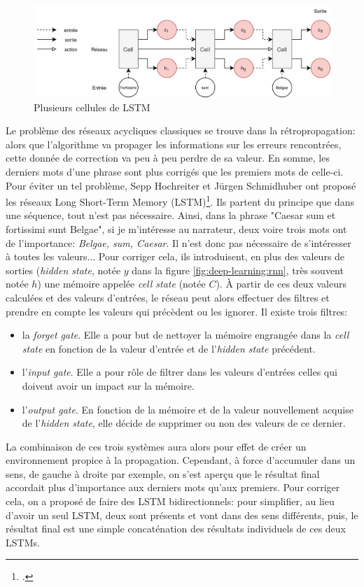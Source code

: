 \begin{figure}[h]
    \centering
    \includegraphics[width=\linewidth]{results/deep-learning/explanations/LSTM-Zoom-Out.png}
    \caption{Plusieurs cellules de LSTM}
    \label{fig:deep-learning:lstm}
\end{figure}

Le problème des réseaux acycliques classiques se trouve dans la rétropropagation: alors que l'algorithme va propager les informations sur les erreurs rencontrées, cette donnée de correction va peu à peu perdre de sa valeur. En somme, les derniers mots d'une phrase sont plus corrigés que les premiers mots de celle-ci. Pour éviter un tel problème, Sepp Hochreiter et Jürgen Schmidhuber ont proposé les réseaux Long Short-Term Memory (LSTM)\footcite{hochreiter_long_1997}. Ils partent du principe que dans une séquence, tout n'est pas nécessaire. Ainsi, dans la phrase "Caesar sum et fortissimi sunt Belgae", si je m'intéresse au narrateur, deux voire trois mots ont de l'importance: \textit{Belgae, sum, Caesar}. Il n'est donc pas nécessaire de s'intéresser à toutes les valeurs... Pour corriger cela, ils introduisent, en plus des valeurs de sorties (\textit{hidden state}, notée $y$ dans la figure \ref{fig:deep-learning:rnn}, très souvent notée $h$) une mémoire appelée \textit{cell state} (notée $C$). À partir de ces deux valeurs calculées et des valeurs d'entrées, le réseau peut alors effectuer des filtres et prendre en compte les valeurs qui précèdent ou les ignorer. Il existe trois filtres:
\begin{itemize}
    \item la \textit{forget gate}. Elle a pour but de nettoyer la mémoire engrangée dans la \textit{cell state} en fonction de la valeur d'entrée et de l'\textit{hidden state} précédent. 
    \item l'\textit{input gate}. Elle a pour rôle de filtrer dans les valeurs d'entrées celles qui doivent avoir un impact sur la mémoire.
    \item l'\textit{output gate}. En fonction de la mémoire et de la valeur nouvellement acquise de l'\textit{hidden state}, elle décide de supprimer ou non des valeurs de ce dernier.
\end{itemize}
La combinaison de ces trois systèmes aura alors pour effet de créer un environnement propice à la propagation. Cependant, à force d'accumuler dans un sens, de gauche à droite par exemple, on s'est aperçu que le résultat final accordait plus d'importance aux derniers mots qu'aux premiers. Pour corriger cela, on a proposé de faire des LSTM bidirectionnels: pour simplifier, au lieu d'avoir un seul LSTM, deux sont présents et vont dans des sens différents, puis, le résultat final est une simple concaténation des résultats individuels de ces deux LSTMs.

